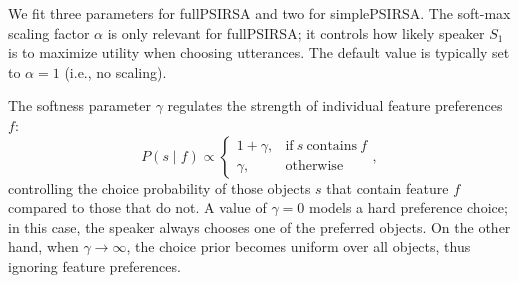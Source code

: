 \documentclass[11pt,a4paper]{article}
\begin{document}
We fit three parameters for fullPSIRSA and two for simplePSIRSA.
The soft-max scaling factor $\alpha$ is only relevant for fullPSIRSA; it  controls how likely speaker $S_1$ is to maximize utility when choosing utterances. 
The default value is typically set to $\alpha=1$ (i.e., no scaling). 


The softness parameter $\gamma$ regulates the strength of individual feature preferences $f$:
\begin{equation}
	P(s \mid f) \propto \begin{cases}
		1 + \gamma, & \text{if}\ s\ \text{contains}\ f \\
		\gamma, & \text{otherwise}
	\end{cases},
\end{equation}
controlling the choice probability of those objects $s$ that contain feature $f$ compared to those that do not.  
A value of $\gamma=0$ models a hard preference choice; in this case, the speaker always chooses one of the preferred objects. 
On the other hand, when $\gamma \rightarrow \infty$, the choice prior becomes uniform over all objects, thus ignoring feature preferences. 
\end{document}

